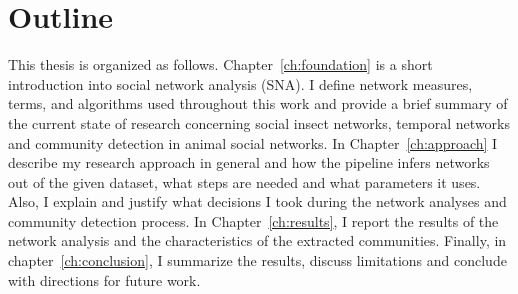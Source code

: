 \section{Outline}
This thesis is organized as follows.
Chapter~\ref{ch:foundation} is a short introduction into social network analysis (SNA). I define network measures, terms, and algorithms used throughout this work and provide a brief summary of the current state of research concerning social insect networks, temporal networks and community detection in animal social networks.
In Chapter~\ref{ch:approach} I describe my research approach in general and how the pipeline infers networks out of the given dataset, what steps are needed and what parameters it uses.
Also, I explain and justify what decisions I took during the network analyses and community detection process.
In Chapter~\ref{ch:results}, I report the results of the network analysis and the characteristics of the extracted communities.
Finally, in chapter~\ref{ch:conclusion}, I summarize the results, discuss limitations and conclude with directions for future work.